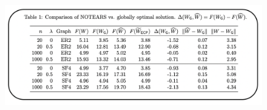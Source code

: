 \documentclass[11pt,a4paper]{article}
\begin{document}
\begin{figure}[ht!]
\center
\includegraphics[width=16cm]{figures/tab1.png}
\label{fig:figs_1_2}
\end{figure}


 

\clearpage
\appendix
\end{document}
